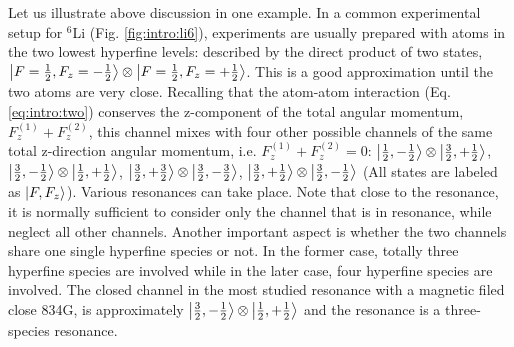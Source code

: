 Let us illustrate above discussion in  one example.  In a common experimental setup for $^{6}$Li (Fig. \ref{fig:intro:li6}), experiments are usually  prepared with atoms in the two lowest hyperfine levels: described by the  direct product of two states, $\left|F=\frac{1}{2},F_{z}=-\frac{1}{2}\right>\otimes\left|F=\frac{1}{2},F_{z}=+\frac{1}{2}\right>$.  This is a good approximation until the two atoms are very close.  Recalling that the atom-atom interaction (Eq. \ref{eq:intro:two}) conserves the z-component of the total angular momentum, $F_{z}^{(1)}+F_{z}^{(2)}$, this channel mixes with four other possible channels of the same total z-direction angular momentum, i.e. $F_{z}^{(1)}+F_{z}^{(2)}=0$: $\left|\frac{1}{2},-\frac{1}{2}\right>\otimes\left|\frac{3}{2},+\frac{1}{2}\right>$, $\left|\frac{3}{2},-\frac{1}{2}\right>\otimes\left|\frac{1}{2},+\frac{1}{2}\right>$, $\left|\frac{3}{2},+\frac{3}{2}\right>\otimes\left|\frac{3}{2},-\frac{3}{2}\right>$, $\left|\frac{3}{2},+\frac{1}{2}\right>\otimes\left|\frac{3}{2},-\frac{1}{2}\right>$ (All states are labeled as $\left|F,F_{z}\right>$).  Various resonances can take place.  Note that close to the resonance, it is normally sufficient to consider only the  channel that is in resonance, while neglect all other channels.  Another important aspect is whether the two channels share one single hyperfine species or not.  In the former case,  totally three hyperfine species are involved while in the later case, four hyperfine species are involved.   The closed channel in the most studied resonance with a magnetic filed close 834G, is approximately $\left|\frac{3}{2},-\frac{1}{2}\right>\otimes\left|\frac{1}{2},+\frac{1}{2}\right>$ and the resonance is a three-species resonance\cite{ZhangThesis,ChinRMP}. 


